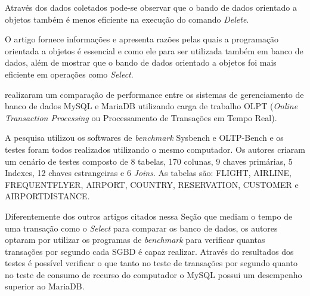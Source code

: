 Através dos dados coletados pode-se observar que o bando de dados orientado a objetos também é menos eficiente na execução do comando \textit{Delete}. 

O artigo fornece informações e apresenta razões pelas quais a programação orientada a objetos é essencial e como ele para ser utilizada também em banco de dados, além de mostrar que o bando de dados orientado a objetos foi mais eficiente em operações como \textit{Select}. 


 realizaram um comparação de performance entre os sistemas de gerenciamento de banco de dados MySQL e MariaDB utilizando carga de trabalho OLPT (\textit{Online Transaction Processing} ou Processamento de Transações em Tempo Real).

A pesquisa utilizou os softwares de \textit{benchmark} Sysbench e OLTP-Bench e os testes foram todos realizados utilizando o mesmo computador. Os autores criaram um cenário de testes composto de 8 tabelas, 170 colunas, 9 chaves primárias, 5 Indexes, 12 chaves estrangeiras e 6 \textit{Joins}. As tabelas são: FLIGHT,
AIRLINE, FREQUENTFLYER, AIRPORT, COUNTRY, RESERVATION, CUSTOMER e AIRPORTDISTANCE.

Diferentemente dos outros artigos citados nessa Seção que mediam o tempo de uma transação como o \textit{Select} para comparar os banco de dados, os autores optaram por utilizar os programas de \textit{benchmark} para verificar quantas transações por segundo cada SGBD é capaz realizar. Através do resultados dos testes é possível verificar o que tanto no teste de transações por segundo quanto no teste de consumo de recurso do computador o MySQL possui um desempenho superior ao MariaDB. 















